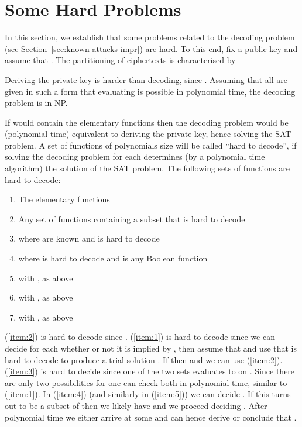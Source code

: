 \documentclass[final,journal,compsoc]{IEEEtran}
\begin{document}
\clearpage
\appendices 

\section{Some Hard Problems\label{sec:some-hard-problems}}

In this section, we establish that some problems related to the
decoding problem (see Section~\ref{sec:known-attacks-impr}) are hard.
To this end, fix a public key  and assume that
. The partitioning of ciphertexts  is characterised by


Deriving the private key is harder than decoding, since . Assuming that all  are given in
such a form that evaluating  is possible in polynomial time, the decoding problem is in NP.

If  would contain the elementary functions 
then the decoding problem would be (polynomial time) equivalent to
deriving the private key, hence solving the SAT problem.  A set of
functions  of polynomials size will be called ``hard to decode'',
if solving the decoding problem for each  determines (by a
polynomial time algorithm) the solution of the SAT problem. 
The following
sets of functions are hard to decode:
\begin{enumerate}
\item\label{item:6} The elementary functions 

\item\label{item:7} Any set of functions containing a subset that is hard to decode

\item\label{item:2}
   where  are known and
   is
  hard to decode

\item\label{item:1}
  where
  is hard to decode and  is any Boolean function 

\item\label{item:3}  
  with ,  as above

\item\label{item:4}  with ,  as above 

\item\label{item:5}  with ,  as above 

\end{enumerate}
(\ref{item:2}) is hard to decode since .
(\ref{item:1}) is hard to decode since we can decide for each  whether or not it is implied by , then assume that
 and use that  is hard to decode to produce a trial
solution . If  then  and we
can use (\ref{item:2}). (\ref{item:3}) is hard to decide since one of
the two sets evaluates to  on . Since there are only two
possibilities for  one can check both in polynomial time,
similar to (\ref{item:1}). In (\ref{item:4}) (and similarly in (\ref{item:5})) we can
decide . If this turns out to be a subset of 
then we likely have  and we proceed deciding . After polynomial time we either arrive at some 
and can hence derive  or conclude that .
\end{document}
